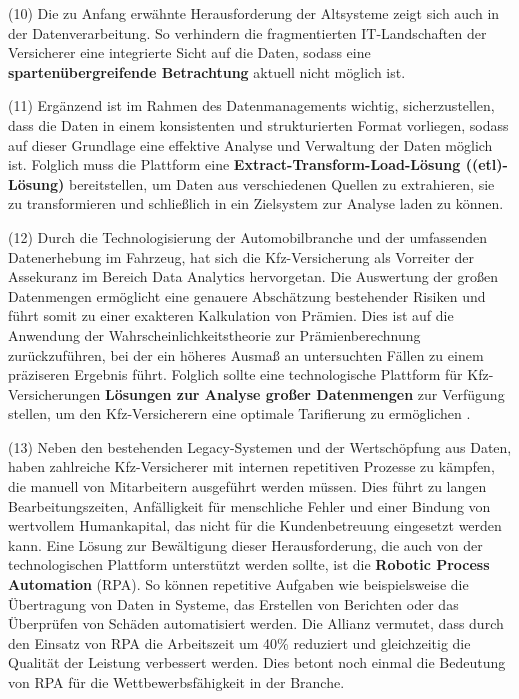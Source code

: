 (10) Die zu Anfang erwähnte Herausforderung der Altsysteme zeigt sich auch in der Datenverarbeitung. So verhindern die fragmentierten IT-Landschaften der Versicherer eine integrierte Sicht auf die Daten, sodass eine \textbf{spartenübergreifende Betrachtung} aktuell nicht möglich ist. \autocite[Vgl.][S. 11]{GUNTER2020}

(11) Ergänzend ist im Rahmen des Datenmanagements wichtig, sicherzustellen, dass die Daten in einem konsistenten und strukturierten Format vorliegen, sodass auf dieser Grundlage eine effektive Analyse und Verwaltung der Daten möglich ist. Folglich muss die Plattform eine \textbf{Extract-Transform-Load-Lösung ((\acs{etl})-Lösung)} bereitstellen, um Daten aus verschiedenen Quellen zu extrahieren, sie zu transformieren und schließlich in ein Zielsystem zur Analyse laden zu können. \autocite[Vgl.][]{WEINGARTNER2023}

(12) Durch die Technologisierung der Automobilbranche und der umfassenden Datenerhebung im Fahrzeug, hat sich die Kfz-Versicherung als Vorreiter der Assekuranz im Bereich Data Analytics hervorgetan. \autocite[Vgl.][S. 187]{GATZERT2023} Die Auswertung der großen Datenmengen ermöglicht eine genauere Abschätzung bestehender Risiken und führt somit zu einer exakteren Kalkulation von Prämien. Dies ist auf die Anwendung der Wahrscheinlichkeitstheorie zur Prämienberechnung zurückzuführen, bei der ein höheres Ausmaß an untersuchten Fällen zu einem präziseren Ergebnis führt. Folglich sollte eine technologische Plattform für Kfz-Versicherungen \textbf{Lösungen zur Analyse großer Datenmengen} zur Verfügung stellen, um den Kfz-Versicherern eine optimale Tarifierung zu ermöglichen \autocite[Vgl.][S. 146]{MANGEI2019}. 

(13) Neben den bestehenden Legacy-Systemen und der Wertschöpfung aus Daten, haben zahlreiche Kfz-Versicherer mit internen repetitiven Prozesse zu kämpfen, die manuell von Mitarbeitern ausgeführt werden müssen. Dies führt zu langen Bearbeitungszeiten, Anfälligkeit für menschliche Fehler und einer Bindung von wertvollem Humankapital, das nicht für die Kundenbetreuung eingesetzt werden kann. Eine Lösung zur Bewältigung dieser Herausforderung, die auch von der technologischen Plattform unterstützt werden sollte, ist die \textbf{Robotic Process Automation} (RPA). So können repetitive Aufgaben wie beispielsweise die Übertragung von Daten in Systeme, das Erstellen von Berichten oder das Überprüfen von Schäden automatisiert werden. \autocite[Vgl.][S. 296-298]{REICH2019}  Die Allianz vermutet, dass durch den Einsatz von RPA die Arbeitszeit um 40\% reduziert und gleichzeitig die Qualität der Leistung verbessert werden. Dies betont noch einmal die Bedeutung von RPA für die Wettbewerbsfähigkeit in der Branche. \autocite[Vgl.][S. 296-298]{REICH2019}

